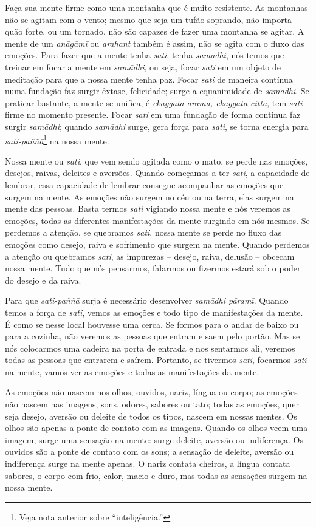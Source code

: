 Faça sua mente firme como uma montanha que é muito resistente. As
montanhas não se agitam com o vento; mesmo que seja um tufão soprando,
não importa quão forte, ou um tornado, não são capazes de fazer uma
montanha se agitar. A mente de um \textit{anāgāmī} ou
\textit{arahant} também é assim, não se agita com o fluxo das emoções.
Para fazer que a mente tenha \textit{sati}, tenha \textit{samādhi},
nós temos que treinar em focar a mente em \textit{samādhi}, ou seja,
focar \textit{sati} em um objeto de meditação para que a nossa mente
tenha paz. Focar \textit{sati} de maneira contínua numa fundação faz
surgir êxtase, felicidade; surge a equanimidade de \textit{samādhi}.
Se praticar bastante, a mente se unifica, é \textit{ekaggatā arama,
ekaggatā citta}, tem \textit{sati} firme no momento presente. Focar
\textit{sati} em uma fundação de forma contínua faz surgir
\textit{samādhi}; quando \textit{samādhi} surge, gera força para
\textit{sati}, se torna energia para
\textit{sati-paññā}\footnote{Veja nota anterior sobre
“inteligência.”} na nossa mente.

Nossa mente ou \textit{sati}, que vem sendo agitada como o mato, se
perde nas emoções, desejos, raivas, deleites e aversões. Quando
começamos a ter \textit{sati}, a capacidade de lembrar, essa capacidade
de lembrar consegue acompanhar as emoções que surgem na mente. As
emoções não surgem no céu ou na terra, elas surgem na mente das
pessoas. Basta termos \textit{sati} vigiando nossa mente e nós veremos
as emoções, todas as diferentes manifestações da mente surgindo em nós
mesmos. Se perdemos a atenção, se quebramos \textit{sati}, nossa mente
se perde no fluxo das emoções como desejo, raiva e sofrimento que
surgem na mente. Quando perdemos a atenção ou quebramos \textit{sati},
as impurezas – desejo, raiva, delusão – obcecam nossa mente. Tudo que
nós pensarmos, falarmos ou fizermos estará sob o poder do desejo e da
raiva.

Para que \textit{sati-paññā} surja é necessário desenvolver
\textit{samādhi pāramī}. Quando temos a força de \textit{sati},
vemos as emoções e todo tipo de manifestações da mente. É como se nesse
local houvesse uma cerca. Se formos para o andar de baixo ou para a
cozinha, não veremos as pessoas que entram e saem pelo portão. Mas se
nós colocarmos uma cadeira na porta de entrada e nos sentarmos ali,
veremos todas as pessoas que entrarem e saírem. Portanto, se tivermos
\textit{sati}, focarmos \textit{sati} na mente, vamos ver as emoções e
todas as manifestações da mente.

As emoções não nascem nos olhos, ouvidos, nariz, língua ou corpo; as
emoções não nascem nas imagens, sons, odores, sabores ou tato; todas as
emoções, quer seja desejo, aversão ou deleite de todos os tipos, nascem
em nossas mentes. Os olhos são apenas a ponte de contato com as
imagens. Quando os olhos veem uma imagem, surge uma sensação na mente:
surge deleite, aversão ou indiferença. Os ouvidos são a ponte de
contato com os sons; a sensação de deleite, aversão ou indiferença
surge na mente apenas. O nariz contata cheiros, a língua contata
sabores, o corpo com frio, calor, macio e duro, mas todas as sensações
surgem na nossa mente.

